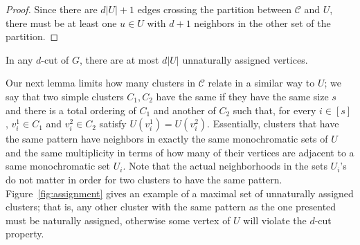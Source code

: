 \begin{proof}
    Since there are $d|U| + 1$ edges crossing the partition between $\mathcal{C}$ and $U$, there must be at least one $u \in U$ with $d+1$ neighbors in the other set of the partition.
\end{proof}

\begin{corollary}
    \label{cor:constrained_unnatural}
    In any $d$-cut of $G$, there are at most $d|U|$ unnaturally assigned vertices.
\end{corollary}


Our next lemma limits how many clusters in $\mathcal{C}$ relate in a similar way to $U$; we say that two simple clusters $C_1, C_2$ have the same  if they have the same size $s$ and there is a total ordering of $C_1$ and another of $C_2$ such that, for every $i \in [s]$, $v_i^1 \in C_1$ and $v_i^2 \in C_2$ satisfy $U(v_i^1) = U(v_i^2)$.
Essentially, clusters that have the same pattern have neighbors in exactly the same monochromatic sets of $U$ and the same multiplicity in terms of how many of their vertices are adjacent to a same monochromatic set $U_i$. Note that the actual neighborhoods in the sets $U_i$'s do not matter in order for two clusters to have the same pattern.
Figure~\ref{fig:assignment} gives an example of a maximal set of unnaturally assigned clusters; that is, any other cluster with the same pattern as the one presented must be naturally assigned, otherwise some vertex of $U$ will violate the $d$-cut property.

